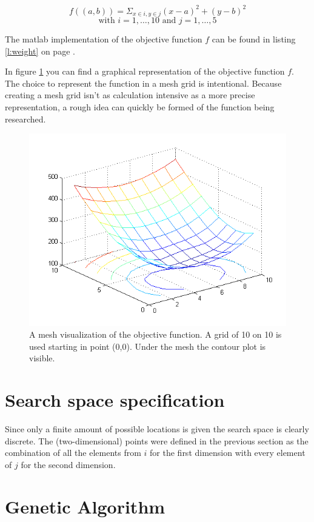 \documentclass[11pt,a4paper,oneside]{article}
\begin{document}
$$f((a,b)) =  \Sigma_{x \in i, y \in j} (x - a)^2 + (y - b)^2 $$
$$\text{with } i = {1,\ldots,10}\text{ and }j ={1,\ldots,5}$$

The matlab implementation of the objective function $f$ can be found in listing \ref{l:weight} on page \pageref{l:weight}.

In figure \ref{fig:mesh} you can find a graphical representation of the objective function $f$.
The choice to represent the function in a mesh grid is intentional. 
Because creating a mesh grid isn't as calculation intensive as a more precise representation, a rough idea can quickly be formed of the function being researched.


\begin{figure}
		\centering
		\includegraphics{mesh.png}
		\caption{A mesh visualization of the objective function. A grid of 10 on 10 is used starting in point (0,0). Under the mesh the contour plot is visible.}
		\label{fig:mesh}
\end{figure}
\section{Search space specification}
Since only a finite amount of possible locations is given the search space is clearly discrete. The (two-dimensional) points were defined in the previous section as the combination of all the elements from $i$ for the first dimension with every element of $j$ for the second dimension.

\section{Genetic Algorithm}
\end{document}
